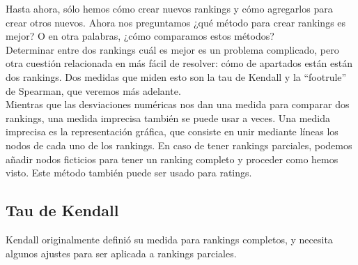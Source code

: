  Hasta ahora, sólo hemos cómo crear nuevos rankings y cómo agregarlos para crear otros nuevos. Ahora nos preguntamos ¿qué método para crear rankings es mejor? O en otra palabras, ¿cómo comparamos estos métodos?\\
 
 Determinar entre dos rankings cuál es mejor es un problema complicado, pero otra cuestión relacionada en más fácil de resolver: cómo de apartados están están dos rankings. Dos medidas que miden esto son la tau de Kendall y la ``footrule'' de Spearman, que veremos más adelante.\\
 
 Mientras que las desviaciones numéricas nos dan una medida para comparar dos rankings, una medida imprecisa también se puede usar a veces. Una medida imprecisa es la representación gráfica, que consiste en unir mediante líneas los nodos de cada uno de los rankings. En caso de tener rankings parciales, podemos añadir nodos ficticios para tener un ranking completo y proceder como hemos visto. Este método también puede ser usado para ratings.
 
 \subsection{Tau de Kendall} 
 
 Kendall originalmente definió su medida para rankings completos, y necesita algunos ajustes para ser aplicada a rankings parciales.